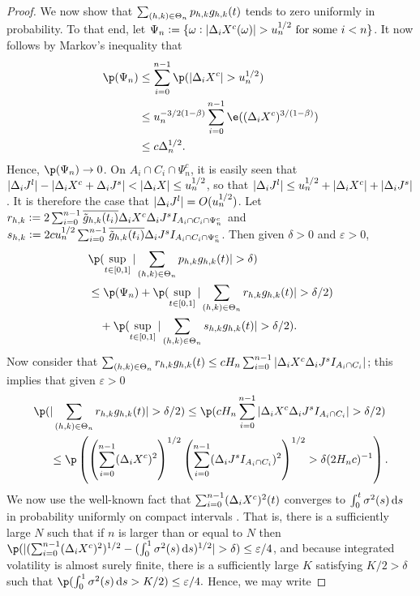 \begin{proof}
We now show that $\sum_{(h,k) \in \Theta_n} p_{h,k} g_{h,k} (t)$ tends to zero uniformly  in probability.
To that end, let $\Psi_n := \{\omega: \vert \Delta_i X^c(\omega) \vert > u_n^{1/2} \text{ for some } i < n\}$.  It now follows by Markov's inequality that 
\begin{align}
  \p(\Psi_n ) &\le \sumin \p(\vert \dxc \vert > u_n^{1/2}) \notag \\
  & \le u_n^{-3/2(1 - \beta) } \sumin \e( (\dxc)^{ 3/(1 - \beta)} ) \notag\\
  & \le  c \Delta_n^{1/2}.
  \label{}
\end{align}
Hence, $\p(\Psi_n ) \to 0$. On $A_i \cap C_i \cap \Psi_n^c$, it is easily seen that $\vert \Delta_i J^l \vert - \vert \Delta_i X^c + \Delta_i J^s \vert < \vert \Delta_i X \vert \le u_n^{1/2}$, so that $\vert \Delta_i J^l\vert \le u^{1/2}_n + \vert \Delta_i X^c \vert + \vert \Delta_i J^s\vert$. It is therefore the case that  $ \vert \Delta_i J^l \vert  = O(u^{1/2}_n)$. Let $r_{h,k} :=  2 \sum_{i = 0}^{n-1} \overline{\tilde{g}_{h,k}(t_i)}\Delta_i X^c \Delta_i J^s I_{A_i \cap C_i \cap \Psi_n^c}$ and $s_{h,k} := 2 c u_n^{1/2}\sum_{i = 0}^{n-1} \overline{\tilde{g}_{h,k}(t_i)} \Delta_i J^s I_{A_i \cap C_i \cap \Psi_n^c}$. Then given  $\delta > 0$ and $\varepsilon > 0$, 
\begin{align}
  &\p(\sup_{t \in \domain}\vert\sumt p_{h,k} \ghk(t) \vert > \delta)\notag \\&  \le \p(\Psi_n) + \p(\sup_{t \in \domain} \vert\sumt r_{h,k} \ghk(t) \vert > \delta/2)  \notag \\
  &\quad + \p(\sup_{t \in \domain} \vert\sumt s_{h,k} \ghk(t) \vert > \delta/2).
  \label{eq:phk}
\end{align}
Now consider that $\sum_{(h,k) \in \Theta_n} r_{h,k} g_{h,k}(t) \le  c H_n \sum_{i = 0}^{n-1} \vert \Delta_i X^c \Delta_i J^s  I_{A_i \cap C_i} \vert$; this implies that given $\varepsilon > 0$  
\begin{align}
  \p(&\vert\sumt r_{h,k} \ghk(t) \vert > \delta/2) \le \p(c H_n  \sumin \vert \dxc \djt I_{A_i \cap C_i} \vert  > \delta/2)\notag\\& \le \p\left( \left(\sumin (\dxc)^2\right)^{1/2} \left(\sumin ( \djt I_{A_i \cap C_i})^2\right)^{1/2} > \delta (2H_nc)^{-1}\right).\notag
  \label{}
\end{align}
We now use the well-known fact  that  $\sum_{i = 0}^{n-1} (\Delta_i X^c)^2 (t)$ converges to $\int_0^t\sigma^2(s)\D s$ in probability uniformly on compact intervals \citep[Theorem II.22]{Protter2004}. That is, there is a sufficiently large $N$ such that if $n$ is larger than or equal to $N$ then   $ \p(\vert (\sumin (\dxc)^2)^{1/2}  - (\int_0^1\sigma^2(s) \D s)^{1/2}\vert > \delta ) \le  \varepsilon/4$, and because integrated volatility is almost surely finite, there is a sufficiently large $K$ satisfying  $K/2 > \delta$ such that $\p( \int_0^1\sigma^2(s) \D s > K/2) \le \varepsilon/4.$ Hence, we may write

\end{proof}
